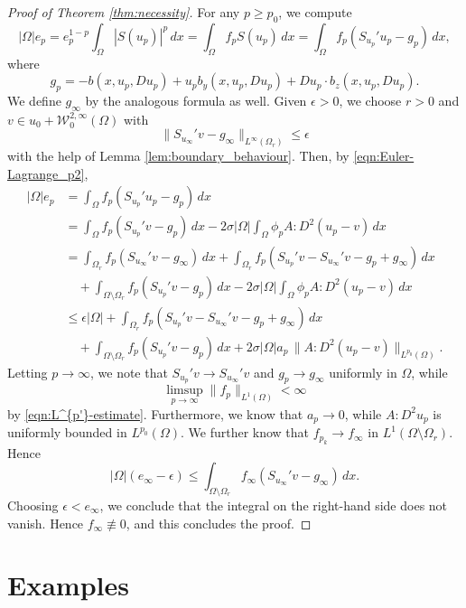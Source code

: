 \documentclass[a4paper]{article}
\newcommand{\W}{\mathcal{W}}
\theoremstyle{remark}
\begin{document}
\begin{proof}[Proof of Theorem \ref{thm:necessity}]
For any $p \ge p_0$, we compute
\[
|\Omega| e_p = e_p^{1 - p} \int_\Omega |S(u_p)|^p \, dx = \int_\Omega f_p S(u_p) \, dx = \int_\Omega f_p\left(S_{u_p}' u_p - g_p\right) \, dx,
\]
where
\[
g_p = - b(x, u_p, Du_p) + u_p b_y(x, u_p, Du_p) + Du_p \cdot b_z(x, u_p, Du_p).
\]
We define $g_\infty$ by the analogous formula as well.
Given $\epsilon > 0$, we choose $r > 0$ and $v \in u_0 + \W_0^{2, \infty}(\Omega)$ with
\[
\|S_{u_\infty}'v - g_\infty\|_{L^\infty(\Omega_r)} \le \epsilon
\]
with the help of Lemma \ref{lem:boundary_behaviour}. Then,
by \eqref{eqn:Euler-Lagrange_p2},
\[
\begin{split}
|\Omega| e_p & = \int_\Omega f_p\left(S_{u_p}' u_p - g_p\right) \, dx \\
& = \int_\Omega f_p\left(S_{u_p}' v - g_p\right) \, dx - 2\sigma |\Omega| \int_\Omega \phi_p A : D^2(u_p - v) \, dx \\
& = \int_{\Omega_r} f_p\left(S_{u_\infty}' v - g_\infty\right) \, dx + \int_{\Omega_r} f_p\left(S_{u_p}' v - S_{u_\infty}' v - g_p + g_\infty\right) \, dx \\
& \quad + \int_{\Omega \setminus \Omega_r} f_p\left(S_{u_p}' v - g_p\right) \, dx - 2\sigma |\Omega| \int_\Omega \phi_p A : D^2(u_p - v) \, dx \\
& \le \epsilon |\Omega| + \int_{\Omega_r} f_p\left(S_{u_p}' v - S_{u_\infty}' v - g_p + g_\infty\right) \, dx \\
& \quad + \int_{\Omega \setminus \Omega_r} f_p\left(S_{u_p}' v - g_p\right) \, dx + 2 \sigma |\Omega| a_p \, \|A : D^2(u_p - v)\|_{L^{p_0}(\Omega)}.
\end{split}
\]
Letting $p \to \infty$, we note that
$S_{u_p}' v \to S_{u_\infty}' v$ and $g_p \to g_\infty$ uniformly in $\Omega$,
while
\[
\limsup_{p \to \infty} \|f_p\|_{L^1(\Omega)} < \infty
\]
by \eqref{eqn:L^{p'}-estimate}. Furthermore, we know that $a_p \to 0$, while $A : D^2 u_p$ is uniformly bounded in $L^{p_0}(\Omega)$. We further know that
$f_{p_k} \to f_\infty$ in $L^1(\Omega \setminus \Omega_r)$. Hence
\[
|\Omega| (e_\infty - \epsilon) \le \int_{\Omega \setminus \Omega_r} f_\infty (S_{u_\infty}' v - g_\infty) \, dx.
\]
Choosing $\epsilon < e_\infty$, we conclude that the integral on the right-hand side does not vanish. Hence $f_\infty \not\equiv 0$,
and this concludes the proof.
\end{proof}





\section{Examples}
\end{document}
